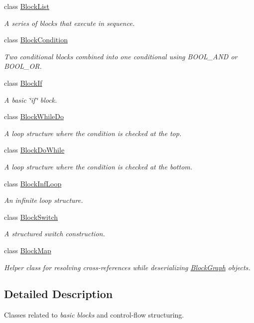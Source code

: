 \begin{DoxyCompactItemize}
class \mbox{\hyperlink{class_block_list}{Block\+List}}
\begin{DoxyCompactList}\small\item\em A series of blocks that execute in sequence. \end{DoxyCompactList}\item 
class \mbox{\hyperlink{class_block_condition}{Block\+Condition}}
\begin{DoxyCompactList}\small\item\em Two conditional blocks combined into one conditional using B\+O\+O\+L\+\_\+\+A\+ND or B\+O\+O\+L\+\_\+\+OR. \end{DoxyCompactList}\item 
class \mbox{\hyperlink{class_block_if}{Block\+If}}
\begin{DoxyCompactList}\small\item\em A basic \char`\"{}if\char`\"{} block. \end{DoxyCompactList}\item 
class \mbox{\hyperlink{class_block_while_do}{Block\+While\+Do}}
\begin{DoxyCompactList}\small\item\em A loop structure where the condition is checked at the top. \end{DoxyCompactList}\item 
class \mbox{\hyperlink{class_block_do_while}{Block\+Do\+While}}
\begin{DoxyCompactList}\small\item\em A loop structure where the condition is checked at the bottom. \end{DoxyCompactList}\item 
class \mbox{\hyperlink{class_block_inf_loop}{Block\+Inf\+Loop}}
\begin{DoxyCompactList}\small\item\em An infinite loop structure. \end{DoxyCompactList}\item 
class \mbox{\hyperlink{class_block_switch}{Block\+Switch}}
\begin{DoxyCompactList}\small\item\em A structured {\itshape switch} construction. \end{DoxyCompactList}\item 
class \mbox{\hyperlink{class_block_map}{Block\+Map}}
\begin{DoxyCompactList}\small\item\em Helper class for resolving cross-\/references while deserializing \mbox{\hyperlink{class_block_graph}{Block\+Graph}} objects. \end{DoxyCompactList}\end{DoxyCompactItemize}


\subsection{Detailed Description}
Classes related to {\itshape basic} {\itshape blocks} and control-\/flow structuring. 

